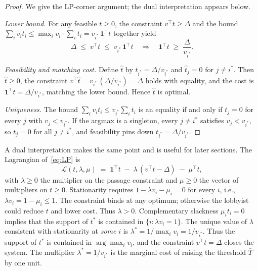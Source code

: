 \documentclass[11pt,letterpaper]{article}
\theoremstyle{plain}
\theoremstyle{definition}
\theoremstyle{remark}
\begin{document}
\begin{proof}
We give the LP-corner argument; the dual interpretation appears below.

\emph{Lower bound.} For any feasible $t \geq 0$, the constraint $v^\top t \geq \Delta$ and the bound $\sum_i v_i t_i \leq \max_i v_i \cdot \sum_i t_i = v_{i^*}\, \mathbf{1}^\top t$ together yield
\[
\Delta \;\leq\; v^\top t \;\leq\; v_{i^*}\, \mathbf{1}^\top t \quad\Longrightarrow\quad \mathbf{1}^\top t \;\geq\; \frac{\Delta}{v_{i^*}}.
\]

\emph{Feasibility and matching cost.} Define $\hat t$ by $\hat t_{i^*} = \Delta / v_{i^*}$ and $\hat t_j = 0$ for $j \neq i^*$. Then $\hat t \geq 0$, the constraint $v^\top \hat t = v_{i^*}\,(\Delta/v_{i^*}) = \Delta$ holds with equality, and the cost is $\mathbf{1}^\top \hat t = \Delta / v_{i^*}$, matching the lower bound. Hence $\hat t$ is optimal.

\emph{Uniqueness.} The bound $\sum_i v_i t_i \leq v_{i^*} \sum_i t_i$ is an equality if and only if $t_j = 0$ for every $j$ with $v_j < v_{i^*}$. If the argmax is a singleton, every $j \neq i^*$ satisfies $v_j < v_{i^*}$, so $t_j = 0$ for all $j \neq i^*$, and feasibility pins down $t_{i^*} = \Delta / v_{i^*}$.
\end{proof}

A dual interpretation makes the same point and is useful for later sections. The Lagrangian of~\eqref{eq:LP} is
\[
\mathcal{L}(t, \lambda, \mu) \;=\; \mathbf{1}^\top t \;-\; \lambda\,(v^\top t - \Delta) \;-\; \mu^\top t,
\]
with $\lambda \geq 0$ the multiplier on the passage constraint and $\mu \geq 0$ the vector of multipliers on $t \geq 0$. Stationarity requires $1 - \lambda v_i - \mu_i = 0$ for every $i$, i.e., $\lambda v_i = 1 - \mu_i \leq 1$. The constraint binds at any optimum; otherwise the lobbyist could reduce $t$ and lower cost. Thus $\lambda > 0$. Complementary slackness $\mu_i t_i = 0$ implies that the support of $t^*$ is contained in $\{i : \lambda v_i = 1\}$. The unique value of $\lambda$ consistent with stationarity at \emph{some} $i$ is $\lambda^* = 1 / \max_i v_i = 1/v_{i^*}$. Thus the support of $t^*$ is contained in $\arg\max_i v_i$, and the constraint $v^\top t = \Delta$ closes the system. The multiplier $\lambda^* = 1 / v_{i^*}$ is the marginal cost of raising the threshold $\bar T$ by one unit.
\end{document}

